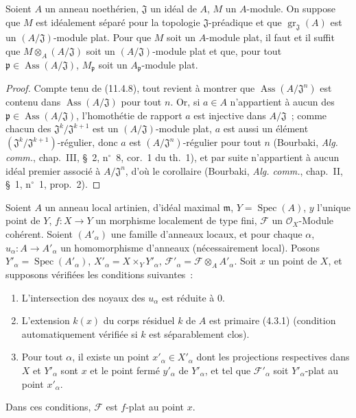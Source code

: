 \begin{corollary}[11.4.10]
\label{IV.11.4.10-fr}
Soient $A$ un anneau noethérien, $\mathfrak J$ un idéal de $A$, $M$ un
$A$-module. On suppose que $M$ est idéalement séparé pour la topologie
$\mathfrak J$-préadique et que $\operatorname{gr}_{\mathfrak J}(A)$ est un
$(A/\mathfrak J)$-module plat. Pour que $M$ soit un $A$-module plat, il faut et
il suffit que $M\otimes_A(A/\mathfrak J)$ soit un $(A/\mathfrak J)$-module plat
et que, pour tout $\mathfrak p\in\operatorname{Ass}(A/\mathfrak J)$,
$M_{\mathfrak p}$ soit un $A_{\mathfrak p}$-module plat.
\end{corollary}

\begin{proof}
Compte tenu de (11.4.8), tout revient à montrer que
$\operatorname{Ass}(A/\mathfrak J^n)$ est contenu dans
$\operatorname{Ass}(A/\mathfrak J)$ pour tout $n$. Or, si $a\in A$ n'appartient
à aucun des $\mathfrak p\in\operatorname{Ass}(A/\mathfrak J)$, l'homothétie de
rapport $a$ est injective dans $A/\mathfrak J$~; comme chacun des
$\mathfrak J^k/\mathfrak J^{k+1}$ est un $(A/\mathfrak J)$-module plat, $a$ est
aussi un élément $(\mathfrak J^k/\mathfrak J^{k+1})$-régulier, donc $a$ est
$(A/\mathfrak J^n)$-régulier pour tout $n$ (Bourbaki, \emph{Alg. comm.},
chap.~III, \S~2, n$^\circ$~8, cor.~1 du th.~1), et par suite n'appartient à
aucun idéal premier associé à $A/\mathfrak J^n$, d'où le corollaire (Bourbaki,
\emph{Alg. comm.}, chap.~II, \S~1, n$^\circ$~1, prop.~2).
\end{proof}

\begin{proposition}[11.4.11]
\label{IV.11.4.11-fr}
Soient $A$ un anneau local artinien, d'idéal maximal $\mathfrak m$,
$Y=\operatorname{Spec}(A)$, $y$ l'unique point de $Y$, $f:X\to Y$ un morphisme
localement de type fini, $\mathcal F$ un $\mathcal O_X$-Module cohérent. Soient
$(A'_\alpha)$ une famille d'anneaux locaux, et pour chaque $\alpha$,
$u_\alpha:A\to A'_\alpha$ un homomorphisme d'anneaux (nécessairement local).
Posons $Y'_\alpha=\operatorname{Spec}(A'_\alpha)$,
$X'_\alpha=X\times_Y Y'_\alpha$,
$\mathcal F'_\alpha=\mathcal F\otimes_A A'_\alpha$. Soit $x$ un point de $X$,
et supposons vérifiées les conditions suivantes~:
\begin{enumerate}[label=(\roman*)]
  \item L'intersection des noyaux des $u_\alpha$ est réduite à $0$.
  \item L'extension $k(x)$ du corps résiduel $k$ de $A$ est primaire (4.3.1)
  (condition automatiquement vérifiée si $k$ est séparablement clos).
  \item Pour tout $\alpha$, il existe un point $x'_\alpha\in X'_\alpha$ dont
  les projections respectives dans $X$ et $Y'_\alpha$ sont $x$ et le point
  fermé $y'_\alpha$ de $Y'_\alpha$, et tel que $\mathcal F'_\alpha$ soit
  $Y'_\alpha$-plat au point $x'_\alpha$.
\end{enumerate}
Dans ces conditions, $\mathcal F$ est $f$-plat au point $x$.
\end{proposition}

